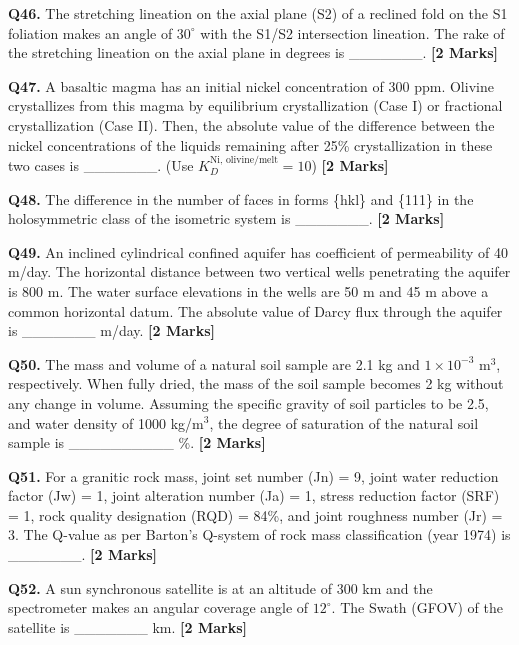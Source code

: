 \documentclass[11pt]{article}
\newcommand{\questionb}[2]{
    \noindent\textbf{Q#2.} #1 \hfill \textbf{[2 Marks]}
}
\begin{document}
\questionb{The stretching lineation on the axial plane (S2) of a reclined fold on the S1 foliation makes an angle of \(30^\circ\) with the S1/S2 intersection lineation. The rake of the stretching lineation on the axial plane in degrees is \_\_\_\_\_\_\_.}{46}
\vspace{0.5cm}

\questionb{A basaltic magma has an initial nickel concentration of 300 ppm. Olivine crystallizes from this magma by equilibrium crystallization (Case I) or fractional crystallization (Case II). Then, the absolute value of the difference between the nickel concentrations of the liquids remaining after 25\% crystallization in these two cases is \_\_\_\_\_\_\_. (Use \( K_D^{\text{Ni, olivine/melt}} = 10 \))}{47}
\vspace{0.5cm}

\questionb{The difference in the number of faces in forms \{hkl\} and \{111\} in the holosymmetric class of the isometric system is \_\_\_\_\_\_\_.}{48}
\vspace{0.5cm}

\questionb{An inclined cylindrical confined aquifer has coefficient of permeability of 40 m/day. The horizontal distance between two vertical wells penetrating the aquifer is 800 m. The water surface elevations in the wells are 50 m and 45 m above a common horizontal datum. The absolute value of Darcy flux through the aquifer is \_\_\_\_\_\_\_ m/day.}{49}
\vspace{0.5cm}

\questionb{The mass and volume of a natural soil sample are 2.1 kg and \(1 \times 10^{-3}\) m\(^3\), respectively. When fully dried, the mass of the soil sample becomes 2 kg without any change in volume. Assuming the specific gravity of soil particles to be 2.5, and water density of 1000 kg/m\(^3\), the degree of saturation of the natural soil sample is \_\_\_\_\_\_\_\_\_\_ \%.}{50}
\vspace{0.5cm}

\questionb{For a granitic rock mass, joint set number (Jn) = 9, joint water reduction factor (Jw) = 1, joint alteration number (Ja) = 1, stress reduction factor (SRF) = 1, rock quality designation (RQD) = 84\%, and joint roughness number (Jr) = 3. The Q-value as per Barton’s Q-system of rock mass classification (year 1974) is \_\_\_\_\_\_\_.}{51}
\vspace{0.5cm}

\questionb{A sun synchronous satellite is at an altitude of 300 km and the spectrometer makes an angular coverage angle of \(12^\circ\). The Swath (GFOV) of the satellite is \_\_\_\_\_\_\_ km.}{52}
\vspace{0.5cm}
\end{document}

